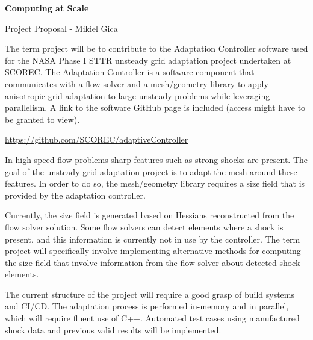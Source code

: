 \documentclass{article}
\begin{document}
\begin{center}
\bfseries Computing at Scale

Project Proposal - Mikiel Gica
\end{center}

The term project will be to contribute to the Adaptation Controller software used for the NASA Phase I STTR unsteady grid adaptation project undertaken at SCOREC. The Adaptation Controller is a software component that communicates with a flow solver and a mesh/geometry library to apply anisotropic grid adaptation to large unsteady problems while leveraging parallelism. A link to the software GitHub page is included (access might have to be granted to view).

\enspace

\url{https://github.com/SCOREC/adaptiveController}

\enspace

In high speed flow problems sharp features such as strong shocks are present. The goal of the unsteady grid adaptation project is to adapt the mesh around these features. In order to do so, the mesh/geometry library requires a size field that is provided by the adaptation controller. 

Currently, the size field is generated based on Hessians reconstructed from the flow solver solution. Some flow solvers can detect elements where a shock is present, and this information is currently not in use by the controller. The term project will specifically involve implementing alternative methods for computing the size field that involve information from the flow solver about detected shock elements.

The current structure of the project will require a good grasp of build systems and CI/CD. The adaptation process is performed in-memory and in parallel, which will require fluent use of C++. Automated test cases using manufactured shock data and previous valid results will be implemented. 
\end{document}
